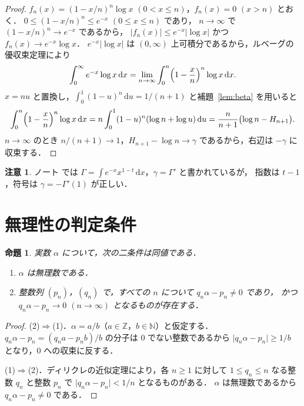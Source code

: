 \documentclass[a4paper,11pt]{ltjsarticle}
\theoremstyle{plain}
\newtheorem{proposition}[theorem]{命題}
\theoremstyle{definition}
\newtheorem{remark}[theorem]{注意}
\newcommand{\N}{\mathbb{N}}
\newcommand{\Z}{\mathbb{Z}}
\newcommand{\dd}{\,\mathrm{d}}
\begin{document}
\begin{proof}
$f_n(x)=(1-x/n)^{n}\log x$ $(0<x\le n)$，$f_n(x)=0$ $(x>n)$ とおく．
$0\le(1-x/n)^{n}\le e^{-x}$ $(0\le x\le n)$ であり，
$n\to\infty$ で $(1-x/n)^{n}\to e^{-x}$ であるから，
$\lvert f_n(x)\rvert\le e^{-x}\lvert\log x\rvert$ かつ $f_n(x)\to e^{-x}\log x$．
$e^{-x}\lvert\log x\rvert$ は $(0,\infty)$ 上可積分であるから，ルベーグの優収束定理により
\[
  \int_0^\infty e^{-x}\log x\dd x=\lim_{n\to\infty}\int_0^{n}\Bigl(1-\frac{x}{n}\Bigr)^{n}\log x\dd x .
\]
$x=nu$ と置換し，$\int_0^1(1-u)^{n}\dd u=1/(n+1)$ と補題~\ref{lem:beta} を用いると
\[
  \int_0^{n}\Bigl(1-\frac{x}{n}\Bigr)^{n}\log x\dd x
  =n\int_0^1(1-u)^{n}(\log n+\log u)\dd u
  =\frac{n}{n+1}\bigl(\log n-H_{n+1}\bigr).
\]
$n\to\infty$ のとき $n/(n+1)\to1$，$H_{n+1}-\log n\to\gamma$ であるから，右辺は $-\gamma$ に収束する．
\end{proof}

\begin{remark}
ノート \cite{Note} では $\Gamma=\int e^{-x}x^{1-t}\dd x$，$\gamma=\Gamma'$ と書かれているが，
指数は $t-1$，符号は $\gamma=-\Gamma'(1)$ が正しい．
\end{remark}

\section{無理性の判定条件}

\begin{proposition}\label{prop:criterion}
実数 $\alpha$ について，次の二条件は同値である．
\begin{enumerate}
  \item $\alpha$ は無理数である．
  \item 整数列 $(p_n)$，$(q_n)$ で，すべての $n$ について $q_n\alpha-p_n\ne0$ であり，
        かつ $q_n\alpha-p_n\to0$ $(n\to\infty)$ となるものが存在する．
\end{enumerate}
\end{proposition}

\begin{proof}
(2)$\Rightarrow$(1)．$\alpha=a/b$（$a\in\Z$，$b\in\N$）と仮定する．
$q_n\alpha-p_n=(q_na-p_nb)/b$ の分子は $0$ でない整数であるから
$\lvert q_n\alpha-p_n\rvert\ge1/b$ となり，$0$ への収束に反する．

(1)$\Rightarrow$(2)．ディリクレの近似定理により，各 $n\ge1$ に対して
$1\le q_n\le n$ なる整数 $q_n$ と整数 $p_n$ で $\lvert q_n\alpha-p_n\rvert<1/n$ となるものがある．
$\alpha$ は無理数であるから $q_n\alpha-p_n\ne0$ である．
\end{proof}
\end{document}
